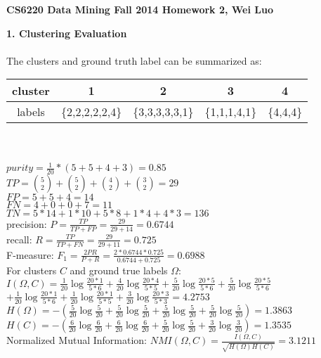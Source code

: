 \documentclass[11pt,a4paper,fleqn]{article}
\begin{document}
\begin{center}
\textbf{CS6220 Data Mining Fall 2014 Homework 2, Wei Luo}\\
\end{center}
\textbf{1. Clustering Evaluation}\\ \\
The clusters and ground truth label can be summarized as:\\
\begin{tabular}{|c|c|c|c|c|}
\hline
cluster&1&2&3&4\\
\hline
labels&\{2,2,2,2,2,4\}&\{3,3,3,3,3,1\}&\{1,1,1,4,1\}&\{4,4,4\}\\
\hline
\end{tabular}\\ \\
$purity = \frac{1}{20}*(5+5+4+3)=0.85$\\
$TP = {5 \choose 2} + {5 \choose 2} + {4 \choose 2} + {3 \choose 2} = 29$\\
$FP = 5 +5 + 4 = 14$\\
$FN = 4 + 0 + 0 + 7 = 11$\\
$TN = 5*14+1*10+5*8+1*4+4*3 = 136$\\
precision: $P = \frac{TP}{TP+FP} = \frac{29}{29+14} = 0.6744$\\
recall: $R = \frac{TP}{TP+FN} = \frac{29}{29+11} = 0.725$\\
F-measure: $F_1=\frac{2PR}{P+R} = \frac{2*0.6744*0.725}{0.6744+0.725} = 0.6988$\\
For clusters $C$ and ground true labels $\Omega$:\\
$I(\Omega,C) = \frac{1}{20}\log\frac{20*1}{5*6}+\frac{4}{20}\log\frac{20*4}{5*5}+\frac{5}{20}\log\frac{20*5}{5*6}+\frac{5}{20}\log\frac{20*5}{5*6}$\\
\indent \indent \indent $+\frac{1}{20}\log\frac{20*1}{5*6}+\frac{1}{20}\log\frac{20*1}{5*5}+\frac{3}{20}\log\frac{20*3}{5*3}=4.2753$\\
$H(\Omega) = -(\frac{5}{20}\log\frac{5}{20} +  \frac{5}{20}\log\frac{5}{20} + \frac{5}{20}\log\frac{5}{20}  + \frac{5}{20}\log\frac{5}{20}) = 1.3863$\\
$H(C) = -(\frac{6}{20}\log\frac{6}{20} +  \frac{6}{20}\log\frac{6}{20} + \frac{5}{20}\log\frac{5}{20}  + \frac{3}{20}\log\frac{3}{20}) = 1.3535$\\
Normalized Mutual Information: $NMI(\Omega,C) = \frac{I(\Omega,C)}{\sqrt{H(\Omega)H(C)}}= 3.1211$\\
\end{document}
